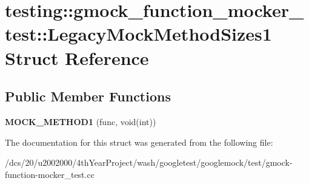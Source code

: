 \hypertarget{structtesting_1_1gmock__function__mocker__test_1_1LegacyMockMethodSizes1}{}\section{testing\+:\+:gmock\+\_\+function\+\_\+mocker\+\_\+test\+:\+:Legacy\+Mock\+Method\+Sizes1 Struct Reference}
\label{structtesting_1_1gmock__function__mocker__test_1_1LegacyMockMethodSizes1}
\subsection*{Public Member Functions}
\begin{DoxyCompactItemize}
\item 
\mbox{\label{structtesting_1_1gmock__function__mocker__test_1_1LegacyMockMethodSizes1_a5cb4e1d90c0cf8ba0807803938baeaa7}} 
{\bfseries M\+O\+C\+K\+\_\+\+M\+E\+T\+H\+O\+D1} (func, void(int))
\end{DoxyCompactItemize}


The documentation for this struct was generated from the following file\+:\begin{DoxyCompactItemize}
\item 
/dcs/20/u2002000/4th\+Year\+Project/wash/googletest/googlemock/test/gmock-\/function-\/mocker\+\_\+test.\+cc\end{DoxyCompactItemize}
